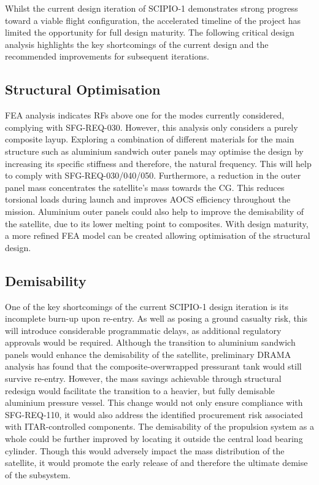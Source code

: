 \documentclass[a4paper, 11pt, conference]{IEEEtran}
\begin{document}
Whilst the current design iteration of SCIPIO-1 demonstrates strong progress toward a viable flight configuration, the accelerated timeline of the project has limited the opportunity for full design maturity. The following critical design analysis highlights the key shortcomings of the current design and the recommended improvements for subsequent iterations.

\subsection{Structural Optimisation}
FEA analysis indicates RFs above one for the modes currently considered, complying with SFG-REQ-030. However, this analysis only considers a purely composite layup. Exploring a combination of different materials for the main structure such as aluminium sandwich outer panels may optimise the design by increasing its specific stiffness and therefore, the natural frequency. This will help to comply with SFG-REQ-030/040/050. Furthermore, a reduction in the outer panel mass concentrates the satellite's mass towards the CG. This reduces torsional loads during launch and improves AOCS efficiency throughout the mission. Aluminium outer panels could also help to improve the demisability of the satellite, due to its lower melting point to composites. With design maturity, a more refined FEA model can be created allowing optimisation of the structural design.

\subsection{Demisability}
\label{sub:demisability}

One of the key shortcomings of the current SCIPIO-1 design iteration is its incomplete burn-up upon re-entry. As well as posing a ground casualty risk, this will introduce considerable programmatic delays, as additional regulatory approvals would be required. Although the transition to aluminium sandwich panels would enhance the demisability of the satellite, preliminary DRAMA analysis has found that the composite-overwrapped pressurant tank would still survive re-entry. However, the mass savings achievable through structural redesign would facilitate the transition to a heavier, but fully demisable aluminium pressure vessel. This change would not only ensure compliance with SFG-REQ-110, it would also address the identified procurement risk associated with ITAR-controlled components. The demisability of the propulsion system as a whole could be further improved by locating it outside the central load bearing cylinder. Though this would adversely impact the mass distribution of the satellite, it would promote the early release of and therefore the ultimate demise of the subsystem.
\end{document}
